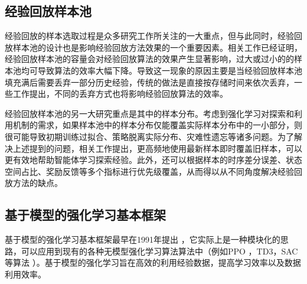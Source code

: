 \subsection{经验回放样本池}

经验回放的样本选取过程是众多研究工作所关注的一大重点，但与此同时，经验回放样本池的设计也是影响经验回放方法效果的一个重要因素。相关工作已经证明，经验回放样本池的容量会对经验回放算法的效果产生显著影响，过大或过小的的样本池均可导致算法的效率大幅下降。导致这一现象的原因主要是当经验回放样本池填充满后需要丢弃一部分历史经验，传统的做法是直接按存储时间来依次丢弃，一些工作提出，不同的丢弃方式也将影响经验回放算法的效率。

经验回放样本池的另一大研究重点是其中的样本分布。考虑到强化学习对探索和利用机制的需求，如果样本池中的样本分布仅能覆盖实际样本分布中的一小部分，则很可能导致初期训练过拟合、策略脱离实际分布、灾难性遗忘等诸多问题。为了解决上述提到的问题，相关工作提出，更高频地使用最新样本即时覆盖旧样本，可以更有效地帮助智能体学习探索经验。此外，还可以根据样本的时序差分误差、状态空间占比、奖励反馈等多个指标进行优先级覆盖，从而得以从不同角度解决经验回放方法的缺点。


\subsection{基于模型的强化学习基本框架}

基于模型的强化学习基本框架最早在1991年提出 \cite{Sutton1991DynaReacting}，它实际上是一种模块化的思路，可以应用到现有的各种无模型强化学习算法算法中（例如PPO ，TD3，SAC等算法 \cite{schulman2017proximal,haarnoja2018soft}）。基于模型的强化学习旨在高效的利用经验数据，提高学习效率以及数据利用效率。

